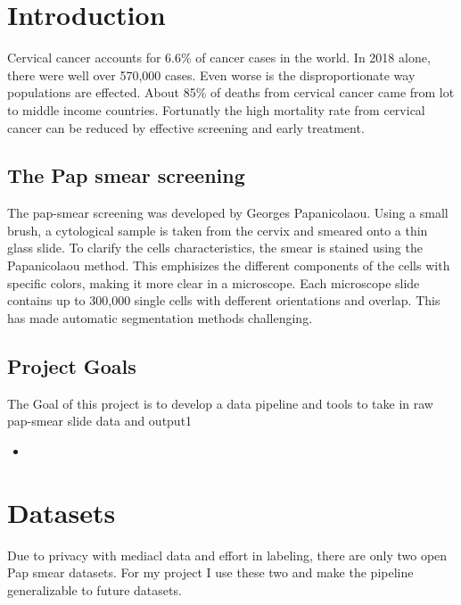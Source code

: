\documentclass[ms,electronic,oneside,twosidetoc,letterpaper,chaptercenter,parttop]{byumsphd}
\title{\Title}
\author{\Author}
\begin{document}
\maketitle
{}

\chapter{Introduction}

Cervical cancer accounts for 6.6\% of cancer cases in the world. In 2018 alone, there were well
over 570,000 cases. Even worse is the disproportionate way populations are effected. About 85\%
of deaths from cervical cancer came from lot to middle income countries.\cite{15}
Fortunatly the high mortality rate from cervical cancer can be reduced by effective screening and early
treatment.

\section{The Pap smear screening}

The pap-smear screening was developed by Georges Papanicolaou. Using a small brush, a cytological sample is taken from the cervix and smeared onto a thin glass slide. 
To clarify the cells characteristics, the smear is stained using the Papanicolaou method. This emphisizes the different components of the cells with specific colors, making it more clear in a microscope.\cite{herlev2}
Each microscope slide contains up to 300,000 single cells with defferent orientations and overlap\cite{herlev2}. This has made automatic segmentation methods challenging.

\section{Project Goals}

The Goal of this project is to develop a data pipeline and tools to take in raw pap-smear slide data and output1
\begin{itemize}
  \item 
\end{itemize}

\chapter{Datasets}

Due to privacy with mediacl data and effort in labeling, there are only two open Pap smear datasets. For my project I use these two and make the pipeline generalizable
to future datasets.
\end{document}
